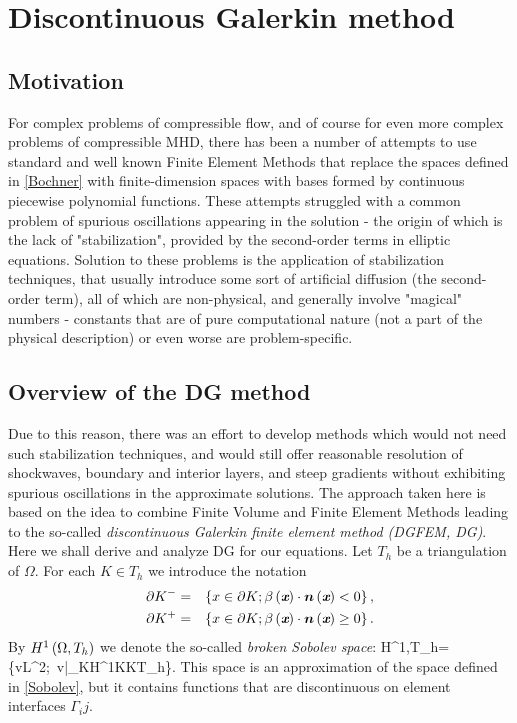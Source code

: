 \section{Discontinuous Galerkin method}

\subsection{Motivation}
For complex problems of compressible flow, and of course for even more complex problems of compressible MHD, there has been a number of attempts to use standard and well known Finite Element Methods that replace the spaces defined in \ref{Bochner} with finite-dimension spaces with bases formed by continuous piecewise polynomial functions. These attempts struggled with a common problem of spurious oscillations appearing in the solution - the origin of which is the lack of "stabilization", provided by the second-order terms in elliptic equations. Solution to these problems is the application of stabilization techniques, that usually introduce some sort of artificial diffusion (the second-order term), all of which are non-physical, and generally involve "magical" numbers - constants that are of pure computational nature (not a part of the physical description) or even worse are problem-specific.

\subsection{Overview of the DG method}
Due to this reason, there  was an effort to develop methods which would not need such stabilization techniques, and would still offer reasonable resolution of shockwaves, boundary and interior layers, and steep gradients without exhibiting spurious oscillations in the approximate solutions. The approach taken here is based on the idea to combine Finite Volume and Finite Element Methods leading to the so-called \emph{discontinuous Galerkin finite element method (DGFEM, DG)}. Here we shall derive and analyze DG for our equations. Let $T_h$ be a triangulation of $\Omega$. For each $K\in T_h$ we introduce the notation
\begin{eqnarray}
\partial K^- & = & \left\{x\in\partial K;\beta\left(\textit{\textbf{x}}\right)\cdot\mbox{\boldmath $n$}\left(\textit{\textbf{x}}\right) <0\right\},\\
\partial K^+ & = & \left\{x\in\partial K;\beta\left(\textit{\textbf{x}}\right)\cdot\mbox{\boldmath $n$}\left(\textit{\textbf{x}}\right) \geq 0\right\}.
\end{eqnarray}
By $H^1\left(\Omega, T_h\right)$ we denote the so-called \textit{broken Sobolev space}:
\be
\label{BrokenSobolev} H^1\lo\Omega,T_h\ro = \left\{v\in L^2\lo\Omega\ro;\ v|_K\in H^1\lo K\ro \forall K\in T_h\right\}.
\ee
This space is an approximation of the space defined in \ref{Sobolev}, but it contains functions that are discontinuous on element interfaces $\Gamma_ij$.

